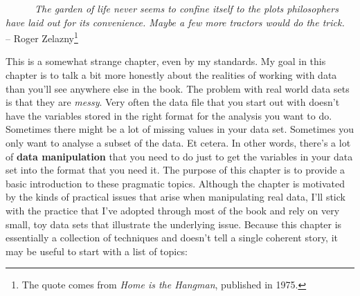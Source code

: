 \documentclass[
]{book}
\begin{document}
~~~~~~\emph{The garden of life never seems to confine itself to the plots philosophers have laid out for its convenience. Maybe a few more tractors would do the trick.}\\
\hspace*{0.333em}\hspace*{0.333em}\hspace*{0.333em}\hspace*{0.333em}\hspace*{0.333em}\hspace*{0.333em}\hspace*{0.333em}\hspace*{0.333em}\hspace*{0.333em}\hspace*{0.333em}\hspace*{0.333em}\hspace*{0.333em}\hspace*{0.333em}\hspace*{0.333em}\hspace*{0.333em}\hspace*{0.333em}\hspace*{0.333em}\hspace*{0.333em}\hspace*{0.333em}\hspace*{0.333em}\hspace*{0.333em}\hspace*{0.333em}\hspace*{0.333em}\hspace*{0.333em}\hspace*{0.333em}\hspace*{0.333em}\hspace*{0.333em}\hspace*{0.333em}\hspace*{0.333em}\hspace*{0.333em}-- Roger Zelazny\footnote{The quote comes from \emph{Home is the Hangman}, published in 1975.}

This is a somewhat strange chapter, even by my standards. My goal in this chapter is to talk a bit more honestly about the realities of working with data than you'll see anywhere else in the book. The problem with real world data sets is that they are \emph{messy}. Very often the data file that you start out with doesn't have the variables stored in the right format for the analysis you want to do. Sometimes there might be a lot of missing values in your data set. Sometimes you only want to analyse a subset of the data. Et cetera. In other words, there's a lot of {\textbf{data manipulation}} that you need to do just to get the variables in your data set into the format that you need it. The purpose of this chapter is to provide a basic introduction to these pragmatic topics. Although the chapter is motivated by the kinds of practical issues that arise when manipulating real data, I'll stick with the practice that I've adopted through most of the book and rely on very small, toy data sets that illustrate the underlying issue. Because this chapter is essentially a collection of techniques and doesn't tell a single coherent story, it may be useful to start with a list of topics:
\end{document}
